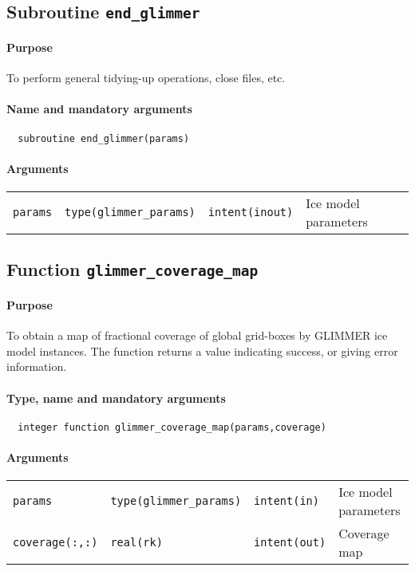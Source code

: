 \documentclass[11pt]{article}
\begin{document}
\subsection{Subroutine \texttt{end\_glimmer}}
%
\paragraph{Purpose} To perform general tidying-up operations, close files, etc.
%
\paragraph{Name and mandatory arguments}
%
\begin{verbatim}
  subroutine end_glimmer(params)
\end{verbatim}
%
\paragraph{Arguments}
%
\begin{center}
\begin{tabular}{llll}
\texttt{params} & \texttt{type(glimmer\_params)} & \texttt{intent(inout)} & Ice model
parameters \\
\end{tabular}
\end{center}
%
\subsection{Function \texttt{glimmer\_coverage\_map}}
%
\paragraph{Purpose} To obtain a map of fractional coverage of global
grid-boxes by GLIMMER ice model instances. The function returns a value
indicating success, or giving error information.
%
\paragraph{Type, name and mandatory arguments}
%
\begin{verbatim}
  integer function glimmer_coverage_map(params,coverage)
\end{verbatim}
%
\paragraph{Arguments}
%
\begin{center}
\begin{tabular}{llll}
\texttt{params} & \texttt{type(glimmer\_params)} & \texttt{intent(in)} & Ice model parameters \\
\texttt{coverage(:,:)} & \texttt{real(rk)} & \texttt{intent(out)} & Coverage
map \\
\end{tabular}
\end{center}
%
\end{document}
